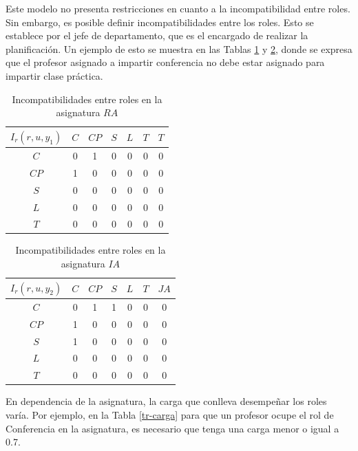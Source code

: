 Este modelo no presenta restricciones en cuanto a la incompatibilidad entre roles. Sin embargo, es posible definir incompatibilidades entre los roles. Esto se establece por el jefe de departamento, que es el encargado de realizar la planificación. Un ejemplo de esto se muestra en las Tablas \ref{ier1-carga} y \ref{ier2-carga}, donde se expresa que el profesor asignado a impartir conferencia no debe estar asignado para impartir clase práctica.

\begin{table}[H]
	\centering
	\caption{Incompatibilidades entre roles en la asignatura $RA$}\label{ier1-carga}
	\begin{tabular}{|c|c|c|c|c|c|c|}
		\hline
		$I_r(r,u,y_1)$  & $C$ & $CP$& $S$ & $L$ & $T$ & $T$  \\ \hline
		$C$  	   		&  0  &  1  &  0  &  0  & 0 & 0	\\ \hline
		$CP$ 	   		&  1  &  0  &  0  &  0  & 0 & 0	\\ \hline
		$S$  	   		&  0  &  0  &  0  &  0  & 0 & 0	\\ \hline
		$L$  	   		&  0  &  0  &  0  &  0  & 0 & 0	\\ \hline
		$T$  	   		&  0  &  0  &  0  &  0  & 0 & 0	\\ \hline
	\end{tabular}
\end{table}

\begin{table}[H]
	\centering
	\caption{Incompatibilidades entre roles en la asignatura $IA$}\label{ier2-carga}
	\begin{tabular}{|c|c|c|c|c|c|c|}
		\hline
		$I_r(r,u,y_2)$  & $C$ & $CP$& $S$ & $L$ & $T$ & $JA$   \\ \hline
		$C$  	   		&  0  &  1  &  1  &  0  & 0 & 0	\\ \hline
		$CP$ 	   		&  1  &  0  &  0  &  0  & 0 & 0	\\ \hline
		$S$  	   		&  1  &  0  &  0  &  0  & 0 & 0	\\ \hline
		$L$  	   		&  0  &  0  &  0  &  0  & 0 & 0	\\ \hline
		$T$  	   		&  0  &  0  &  0  &  0  & 0 & 0	\\ \hline
	\end{tabular}
\end{table}

En dependencia de la asignatura, la carga que conlleva desempeñar los roles varía. Por ejemplo, en la Tabla \ref{tr-carga} para que un profesor ocupe el rol de Conferencia en la asignatura, es necesario que tenga una carga menor o igual a 0.7.

